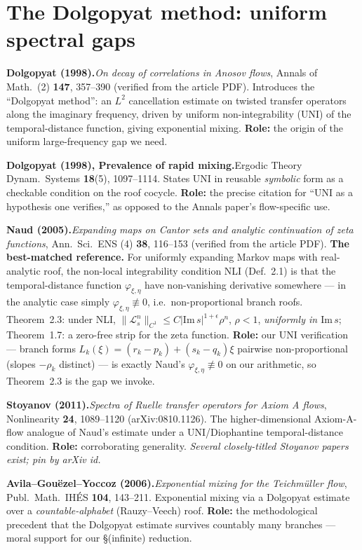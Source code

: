 \documentclass[11pt]{article}
\newcommand{\entry}[2]{\medskip\noindent\textbf{#1}\quad #2\par}
\begin{document}
\section{The Dolgopyat method: uniform spectral gaps}

\entry{Dolgopyat (1998).}{\emph{On decay of correlations in Anosov flows},
Annals of Math.\ (2) \textbf{147}, 357--390 (verified from the article PDF).
Introduces the ``Dolgopyat method'': an $L^2$ cancellation estimate on twisted
transfer operators along the imaginary frequency, driven by uniform
non-integrability (UNI) of the temporal-distance function, giving exponential
mixing. \textbf{Role:} the origin of the uniform large-frequency gap we need.}

\entry{Dolgopyat (1998), Prevalence of rapid mixing.}{Ergodic Theory Dynam.\
Systems \textbf{18}(5), 1097--1114. States UNI in reusable \emph{symbolic} form
as a checkable condition on the roof cocycle. \textbf{Role:} the precise
citation for ``UNI as a hypothesis one verifies,'' as opposed to the Annals
paper's flow-specific use.}

\entry{Naud (2005).}{\emph{Expanding maps on Cantor sets and analytic
continuation of zeta functions}, Ann.\ Sci.\ ENS (4) \textbf{38}, 116--153
(verified from the article PDF). \textbf{The best-matched reference.} For
uniformly expanding Markov maps with real-analytic roof, the non-local
integrability condition NLI (Def.\ 2.1) is that the temporal-distance function
$\varphi_{\xi,\eta}$ have non-vanishing derivative somewhere --- in the analytic
case simply $\varphi_{\xi,\eta}\not\equiv0$, i.e.\ non-proportional branch roofs.
Theorem~2.3: under NLI, $\|\mathcal L_s^n\|_{C^1}\le C|\mathrm{Im}\,s|^{1+\epsilon}
\rho^n$, $\rho<1$, \emph{uniformly in $\mathrm{Im}\,s$}; Theorem~1.7: a zero-free
strip for the zeta function. \textbf{Role:} our UNI verification --- branch forms
$L_k(\xi)=(r_k-p_k)+(s_k-q_k)\xi$ pairwise non-proportional (slopes $-\rho_k$
distinct) --- is exactly Naud's $\varphi_{\xi,\eta}\not\equiv0$ on our arithmetic,
so Theorem~2.3 is the gap we invoke.}

\entry{Stoyanov (2011).}{\emph{Spectra of Ruelle transfer operators for Axiom A
flows}, Nonlinearity \textbf{24}, 1089--1120 (arXiv:0810.1126). The
higher-dimensional Axiom-A-flow analogue of Naud's estimate under a UNI/Diophantine
temporal-distance condition. \textbf{Role:} corroborating generality.
\emph{Several closely-titled Stoyanov papers exist; pin by arXiv id.}}

\entry{Avila--Gou\"ezel--Yoccoz (2006).}{\emph{Exponential mixing for the
Teichm\"uller flow}, Publ.\ Math.\ IH\'ES \textbf{104}, 143--211. Exponential
mixing via a Dolgopyat estimate over a \emph{countable-alphabet} (Rauzy--Veech)
roof. \textbf{Role:} the methodological precedent that the Dolgopyat estimate
survives countably many branches --- moral support for our \S(infinite) reduction.}
\end{document}
